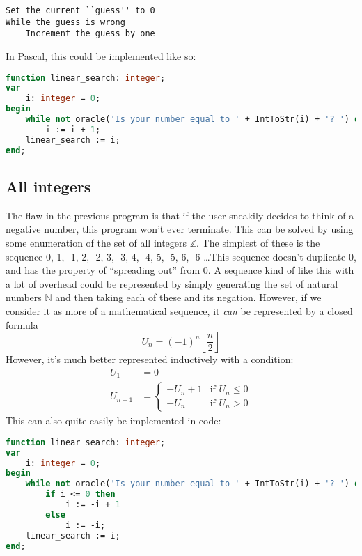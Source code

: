 \documentclass[fleqn,a4paper,11pt]{article}
\begin{document}
\begin{lstlisting}[caption=Linear search on \(\mathbb{N}\) pseudocode]
Set the current ``guess'' to 0
While the guess is wrong
    Increment the guess by one
\end{lstlisting}

    In Pascal, this could be implemented like so:

\begin{lstlisting}[language=Pascal, caption=Linear search on \(\mathbb{N}\) implementation]
function linear_search: integer;
var
    i: integer = 0;
begin
    while not oracle('Is your number equal to ' + IntToStr(i) + '? ') do
        i := i + 1;
    linear_search := i;
end;
\end{lstlisting}

    \subsection{All integers}

    The flaw in the previous program is that if the user sneakily decides to
    think of a negative number, this program won't ever terminate. This can be
    solved by using some enumeration of the set of all integers \(\mathbb{Z}\).
    The simplest of these is the sequence 0, 1, -1, 2, -2, 3, -3, 4, -4, 5, -5,
    6, -6 \ldots This sequence doesn't duplicate 0, and has the property of
    ``spreading out'' from 0. A sequence kind of like this with a lot of
    overhead could be represented by simply generating the set of natural
    numbers \(\mathbb{N}\) and then taking each of these and its negation.
    However, if we consider it as more of a mathematical sequence, it
    \emph{can} be represented by a closed formula
    \begin{equation}
        U_n = (-1)^n \left\lfloor \frac{n}{2} \right\rfloor
    \end{equation}
    However, it's much better represented inductively with a condition:
    \begin{align*}
        U_1 &= 0 \\
        U_{n + 1} &=
        \begin{cases}
            -U_n + 1 & \text{if } U_n \leq 0 \\
            -U_n     & \text{if } U_n > 0
        \end{cases}
    \end{align*}
    This can also quite easily be implemented in code:

\begin{lstlisting}[language=Pascal,
                   caption=Linear search on \(\mathbb{Z}\) implementation]
function linear_search: integer;
var
    i: integer = 0;
begin
    while not oracle('Is your number equal to ' + IntToStr(i) + '? ') do
        if i <= 0 then
            i := -i + 1
        else
            i := -i;
    linear_search := i;
end;
\end{lstlisting}
\end{document}
